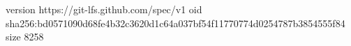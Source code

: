 version https://git-lfs.github.com/spec/v1
oid sha256:bd0571090d68fe4b32c3620d1c64a037bf54f11770774d0254787b3854555f84
size 8258
